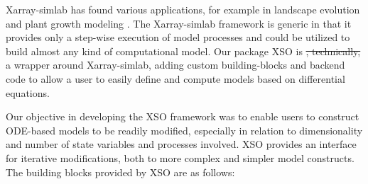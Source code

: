 \documentclass[gmd, manuscript]{copernicus}
\providecommand{\DIFdel}[1]{{\protect\color{red}\sout{#1}}}                      %
\providecommand{\DIFdelbegin}{} %
\providecommand{\DIFdelend}{} %
\begin{document}
Xarray-simlab has found various applications, for example in landscape evolution \citep{Bovy2021Fastscape-lem/fastscape:V0.1.0beta3} and plant growth modeling \citep{Vaillant2022TowardsDevelopment}. The Xarray-simlab framework is generic in that it provides only a step-wise execution of model processes and could be utilized to build almost any kind of computational model. Our package XSO is \DIFdelbegin \DIFdel{, technically, }\DIFdelend a wrapper around Xarray-simlab, adding custom building-blocks and backend code to allow a user to easily define and compute models based on differential equations.

Our objective in developing the XSO framework was to enable users to construct ODE-based models to be readily modified, especially in relation to dimensionality and number of state variables and processes involved. XSO provides an interface for iterative modifications, both to more complex and simpler model constructs. The building blocks provided by XSO are as follows:
\end{document}
